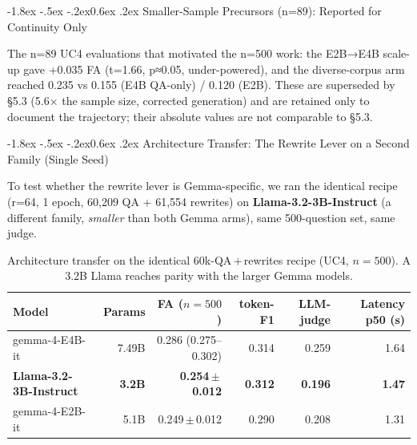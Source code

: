 \documentclass[10pt,twocolumn]{article}
\makeatletter
\renewcommand\subsection{\@startsection{subsection}{2}{\z@}%
  {-1.8ex \@plus -.5ex \@minus -.2ex}{0.6ex \@plus .2ex}%
  {\normalfont\normalsize\bfseries}}
\makeatother
\begin{document}
\hypertarget{smaller-sample-precursors-n89-reported-for-continuity-only}{%
\subsection{Smaller-Sample Precursors (n=89): Reported for Continuity Only}\label{smaller-sample-precursors-n89-reported-for-continuity-only}}

The n=89 UC4 evaluations that motivated the n=500 work: the E2B→E4B scale-up gave +0.035 FA (t=1.66, p≈0.05, under-powered), and the diverse-corpus arm reached 0.235 vs 0.155 (E4B QA-only) / 0.120 (E2B). These are superseded by §5.3 (5.6× the sample size, corrected generation) and are retained only to document the trajectory; their absolute values are not comparable to §5.3.

\hypertarget{architecture-transfer-the-rewrite-lever-on-a-second-family-single-seed}{%
\subsection{Architecture Transfer: The Rewrite Lever on a Second Family (Single Seed)}\label{architecture-transfer-the-rewrite-lever-on-a-second-family-single-seed}}

To test whether the rewrite lever is Gemma-specific, we ran the identical recipe (r=64, 1 epoch, 60,209 QA + 61,554 rewrites) on \textbf{Llama-3.2-3B-Instruct} (a different family, \emph{smaller} than both Gemma arms), same 500-question set, same judge.

\begin{table}[!t]
\centering
\caption{Architecture transfer on the identical 60k-QA\,$+$\,rewrites recipe (UC4, $n{=}500$). A 3.2B Llama reaches parity with the larger Gemma models.}
\label{tab:transfer}
\small
\begin{tabular}{@{}l r r r r r@{}}
\toprule
Model & Params & FA ($n{=}500$) & token-F1 & LLM-judge & Latency p50 (s) \\
\midrule
gemma-4-E4B-it & 7.49B & 0.286 (0.275--0.302) & 0.314 & 0.259 & 1.64 \\
\textbf{Llama-3.2-3B-Instruct} & \textbf{3.2B} & \textbf{0.254\,$\pm$\,0.012} & \textbf{0.312} & \textbf{0.196} & \textbf{1.47} \\
gemma-4-E2B-it & 5.1B & 0.249\,$\pm$\,0.012 & 0.290 & 0.208 & 1.31 \\
\bottomrule
\end{tabular}
\end{table}
\end{document}
